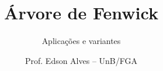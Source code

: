 \title{Árvore de Fenwick}
\subtitle{Aplicações e variantes}
\author{Prof. Edson Alves -- UnB/FGA}
\date{}
